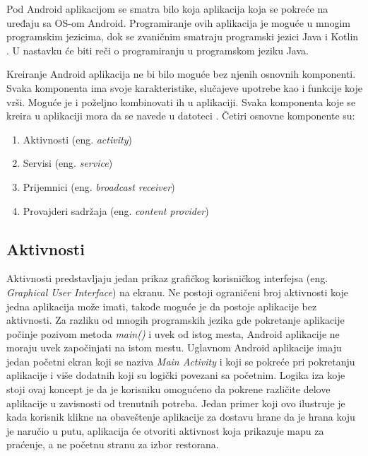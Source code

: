 \documentclass[android.tex]{subfiles}
\begin{document}
Pod Android aplikacijom se smatra bilo koja aplikacija koja se pokreće na uređaju sa OS-om Android. Programiranje ovih aplikacija je moguće u mnogim programskim jezicima, dok se zvaničnim smatraju programski jezici Java i Kotlin \cite{sajt:kotlin}. U nastavku će biti reči o programiranju u programskom jeziku Java.

Kreiranje Android aplikacija ne bi bilo moguće bez njenih osnovnih komponenti. Svaka komponenta ima svoje karakteristike, slučajeve upotrebe kao i funkcije koje vrši. Moguće je i poželjno kombinovati ih u aplikaciji. Svaka komponenta koje se kreira u aplikaciji mora da se navede u datoteci \textit{}. Četiri osnovne komponente su:

\begin{enumerate}
\item Aktivnosti (eng. \textit{activity})
\item Servisi (eng. \textit{service})
\item Prijemnici (eng. \textit{broadcast receiver})
\item Provajderi sadržaja (eng. \textit{content provider})
\end{enumerate}

\subsection{Aktivnosti}
Aktivnosti predstavljaju jedan prikaz grafičkog korisničkog interfejsa (eng. \textit{Graphical User Interface}) na ekranu. Ne postoji ograničeni broj aktivnosti koje jedna aplikacija može imati, takođe moguće je da postoje aplikacije bez aktivnosti. Za razliku od mnogih programskih jezika gde pokretanje aplikacije počinje pozivom metoda \textit{main()} i uvek od istog mesta, Android aplikacije ne moraju uvek započinjati na istom mestu. Uglavnom Android aplikacije imaju jedan početni ekran koji se naziva \textit{Main Activity} i  koji se pokreće pri pokretanju aplikacije i više dodatnih koji su logički povezani sa početnim. Logika iza koje stoji ovaj koncept je da je korisniku omogućeno da pokrene različite delove aplikacije u zavisnosti od trenutnih potreba. Jedan primer koji ovo ilustruje je kada korisnik klikne na obaveštenje aplikacije za dostavu hrane da je hrana koju je naručio u putu, aplikacija će otvoriti aktivnost koja prikazuje mapu za praćenje, a ne početnu stranu za izbor restorana.
\end{document}
